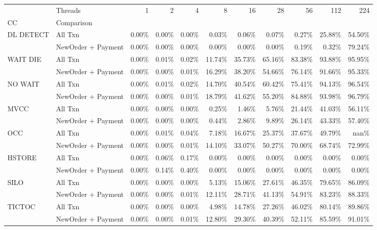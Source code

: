 \begin{tabular}{llrrrrrrrrr}
\toprule
       & Threads &   1   &   2   &   4   &    8   &    16  &    28  &    56  &    112 &    224 \\
CC & Comparison &       &       &       &        &        &        &        &        &        \\
\midrule
DL DETECT & All Txn & 0.00\% & 0.00\% & 0.00\% &  0.03\% &  0.06\% &  0.07\% &  0.27\% & 25.88\% & 54.50\% \\
       & NewOrder + Payment & 0.00\% & 0.00\% & 0.00\% &  0.00\% &  0.00\% &  0.00\% &  0.19\% &  0.32\% & 79.24\% \\
WAIT DIE & All Txn & 0.00\% & 0.01\% & 0.02\% & 11.74\% & 35.73\% & 65.16\% & 83.38\% & 93.88\% & 95.95\% \\
       & NewOrder + Payment & 0.00\% & 0.00\% & 0.01\% & 16.29\% & 38.20\% & 54.66\% & 76.14\% & 91.66\% & 95.33\% \\
NO WAIT & All Txn & 0.00\% & 0.01\% & 0.02\% & 14.70\% & 40.54\% & 60.42\% & 75.41\% & 94.13\% & 96.54\% \\
       & NewOrder + Payment & 0.00\% & 0.00\% & 0.01\% & 18.79\% & 41.62\% & 55.20\% & 84.88\% & 93.98\% & 96.79\% \\
MVCC & All Txn & 0.00\% & 0.00\% & 0.00\% &  0.25\% &  1.46\% &  5.76\% & 21.44\% & 41.03\% & 56.11\% \\
       & NewOrder + Payment & 0.00\% & 0.00\% & 0.00\% &  0.44\% &  2.86\% &  9.89\% & 26.14\% & 43.33\% & 57.40\% \\
OCC & All Txn & 0.00\% & 0.01\% & 0.04\% &  7.18\% & 16.67\% & 25.37\% & 37.67\% & 49.79\% &   nan\% \\
       & NewOrder + Payment & 0.00\% & 0.00\% & 0.01\% & 14.10\% & 33.07\% & 50.27\% & 70.00\% & 68.74\% & 72.99\% \\
HSTORE & All Txn & 0.00\% & 0.06\% & 0.17\% &  0.00\% &  0.00\% &  0.00\% &  0.00\% &  0.00\% &  0.00\% \\
       & NewOrder + Payment & 0.00\% & 0.14\% & 0.40\% &  0.00\% &  0.00\% &  0.00\% &  0.00\% &  0.00\% &  0.00\% \\
SILO & All Txn & 0.00\% & 0.00\% & 0.00\% &  5.13\% & 15.06\% & 27.61\% & 46.35\% & 79.65\% & 86.09\% \\
       & NewOrder + Payment & 0.00\% & 0.00\% & 0.01\% & 12.11\% & 28.71\% & 41.13\% & 54.91\% & 83.23\% & 88.33\% \\
TICTOC & All Txn & 0.00\% & 0.00\% & 0.00\% &  4.98\% & 14.78\% & 27.26\% & 46.02\% & 80.14\% & 89.86\% \\
       & NewOrder + Payment & 0.00\% & 0.00\% & 0.01\% & 12.80\% & 29.30\% & 40.39\% & 52.11\% & 85.59\% & 91.01\% \\
\bottomrule
\end{tabular}
